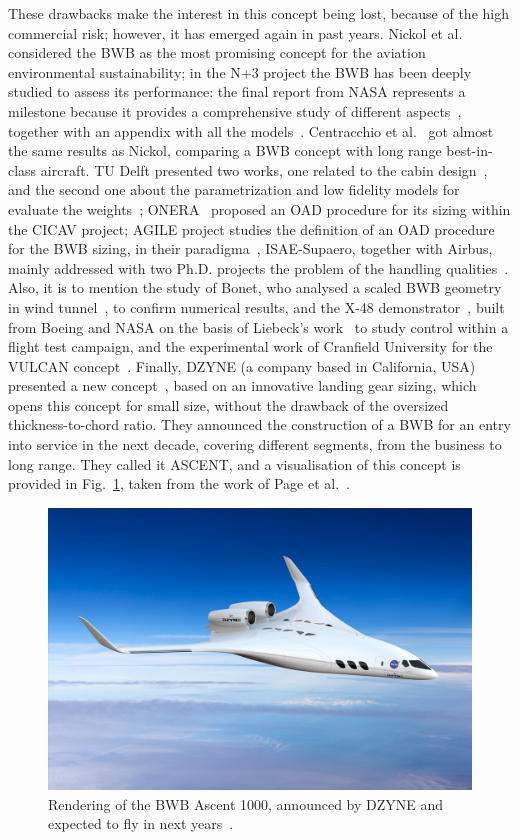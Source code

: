 These drawbacks make the interest in this concept being lost, because of the high commercial risk; however, it has emerged again in past years.
Nickol et al.~\cite{bib:nickol} considered the BWB as the most promising concept for the aviation environmental sustainability; in the N+3 project the BWB has been deeply studied to assess its performance: the final report from NASA represents a milestone because it provides a comprehensive study of different aspects~\cite{bib:bwb_n3_vol1}, together with an appendix with all the models~\cite{bib:bwb_n3_vol2}. 
Centracchio et al.~\cite{bib:centracchio} got almost the same results as Nickol, comparing a BWB concept with long range best-in-class aircraft.
TU Delft presented two works, one related to the cabin design~\cite{bib:vos_bwb}, and the second one about the parametrization and low fidelity models for evaluate the weights~\cite{bib:brown}; ONERA~\cite{bib:defoort} proposed an OAD procedure for its sizing within the CICAV project; AGILE project studies the definition of an OAD procedure for the BWB sizing, in their paradigma~\cite{bib:prakasha, bib:anisimov}, ISAE-Supaero, together with Airbus, mainly addressed with two Ph.D. projects the problem of the handling qualities~\cite{bib:saucez, bib:denieul}.
Also, it is to mention the study of Bonet, who analysed a scaled BWB geometry in wind tunnel~\cite{bib:bonet}, to confirm numerical results, and the X-48 demonstrator~\cite{bib:boeing_x48}, built from Boeing and NASA on the basis of Liebeck's work~\cite{bib:liebeck_2004} to study control within a flight test campaign, and the experimental work of Cranfield University for the VULCAN concept~\cite{bib:perry}.
Finally, DZYNE (a company based in California, USA) presented a new concept~\cite{bib:dzyne_bwb}, based on an innovative landing gear sizing, which opens this concept for small size, without the drawback of the oversized thickness-to-chord ratio.
They announced the construction of a BWB for an entry into service in the next decade, covering different segments, from the business to long range.
They called it ASCENT, and a visualisation of this concept is provided in Fig.~\ref{fig:dzyne_bwb}, taken from the work of Page et al.~\cite{bib:dzyne_bwb}.
\begin{figure}[h!]
	\centering
	\includegraphics[keepaspectratio, width=0.5\linewidth]{images/chap1/dzyne_bwb.jpg}
	\caption{Rendering of the BWB Ascent 1000, announced by DZYNE and expected to fly in next years~\cite{bib:dzyne_bwb}.}
	\label{fig:dzyne_bwb}
\end{figure}

